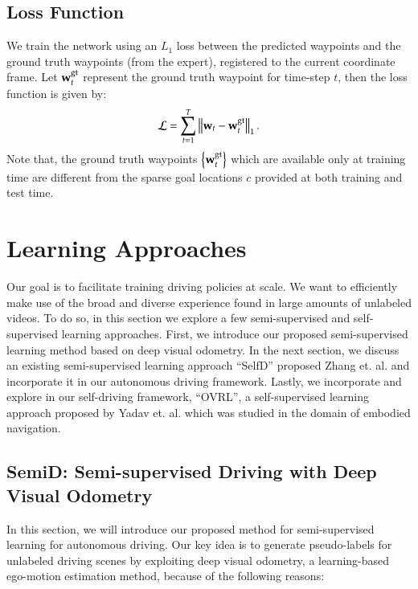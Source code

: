 \documentclass[12pt, letterpaper,cleardoubleempty,BCOR1cm]{scrbook}
\begin{document}
\section{Loss Function \label{org83b2fdf}}
\label{sec:org9ff27af}
We train the network using an \(L_{1}\) loss between the predicted waypoints and
the ground truth waypoints (from the expert), registered to the current
coordinate frame. Let \(\textbf w_{t}^{\text{gt}}\) represent the ground truth
waypoint for time-step \(t\), then the loss function is given by:
\[\mathcal{L}=\sum_{t=1}^{T}\left\| \textbf w_{t}-\textbf w_{t}^{\text{gt}} \right\|_{1}.\] Note that, the
ground truth waypoints \(\left\lbrace \textbf w_{t}^{\text{gt}} \right\rbrace\) which are available only at
training time are different from the sparse goal locations \(c\) provided at
both training and test time.

\chapter{Learning Approaches \label{org96f2539}}
\label{sec:orge1db0fe}
Our goal is to facilitate training driving policies at scale. We want to
efficiently make use of the broad and diverse experience found in large amounts
of unlabeled videos. To do so, in this section we explore a few semi-supervised
and self-supervised learning approaches. First, we introduce our proposed
semi-supervised learning method based on deep visual odometry. In the next
section, we discuss an existing semi-supervised learning approach ``SelfD''
proposed Zhang et. al. \cite{Zhang2022a} and incorporate it in our autonomous
driving framework. Lastly, we incorporate and explore in our self-driving
framework, ``OVRL'', a self-supervised learning approach proposed by Yadav
et. al. \cite{Yadav2022} which was studied in the domain of embodied navigation.

\section{SemiD: Semi-supervised Driving with Deep Visual Odometry \label{org0857abd}}
\label{sec:org408e00d}
In this section, we will introduce our proposed method for semi-supervised
learning for autonomous driving. Our key idea is to generate pseudo-labels for
unlabeled driving scenes by exploiting deep visual odometry, a learning-based
ego-motion estimation method, because of the following reasons:
\end{document}
